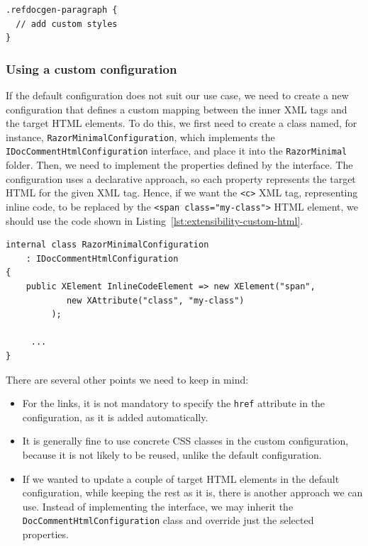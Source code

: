 \begin{listing}[H]
\begin{lstlisting}
.refdocgen-paragraph {
  // add custom styles
}
\end{lstlisting}
\caption{Styling of the transformed inner XML tags}
\label{lst:extensibility-custom-css}
\end{listing}

\subsubsection{Using a custom configuration}

If the default configuration does not suit our use case, we need to create a new configuration that defines a custom mapping between the inner XML tags and the target HTML elements.
To do this, we first need to create a class named, for instance, \texttt{RazorMinimalConfiguration}, which implements the \texttt{IDocCommentHtmlConfiguration} interface, and place it into the \texttt{RazorMinimal} folder.
Then, we need to implement the properties defined by the interface.
The configuration uses a declarative approach, so each property represents the target HTML for the given XML tag.
Hence, if we want the \texttt{<c>} XML tag, representing inline code, to be replaced by the \texttt{<span class="my-class">} HTML element, we should use the code shown in Listing~\ref{lst:extensibility-custom-html}.

\begin{listing}[H]
\begin{lstlisting}
internal class RazorMinimalConfiguration 
    : IDocCommentHtmlConfiguration
{
    public XElement InlineCodeElement => new XElement("span",
            new XAttribute("class", "my-class")
         );

     ...
}
\end{lstlisting}
\caption{Custom configuration mapping the XML tags to HTML.}
\label{lst:extensibility-custom-html}
\end{listing}

There are several other points we need to keep in mind:

\begin{itemize}
    \item For the links, it is not mandatory to specify the \texttt{href} attribute in the configuration, as it is added automatically.
    \item It is generally fine to use concrete CSS classes in the custom configuration, because it is not likely to be reused, unlike the default configuration.
    \item If we wanted to update a couple of target HTML elements in the default configuration, while keeping the rest as it is, there is another approach we can use.
    Instead of implementing the interface, we may inherit the \texttt{DocCommentHtmlConfiguration} class and override just the selected properties.
\end{itemize}

